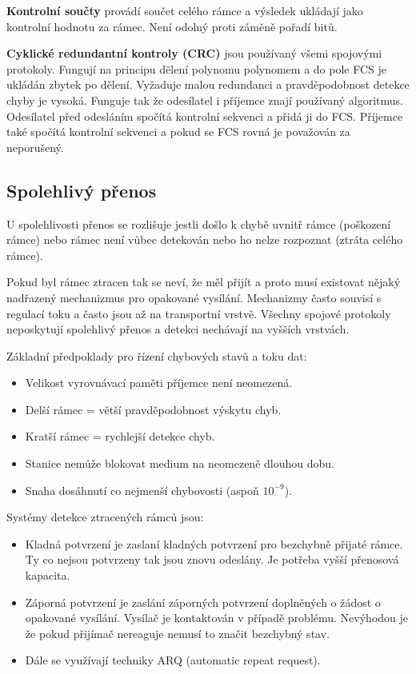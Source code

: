 \textbf{Kontrolní součty} provádí součet celého rámce a výsledek ukládají jako kontrolní hodnotu za rámec. Není odolný proti záměně pořadí bitů.

\textbf{Cyklické redundantní kontroly (CRC)} jsou používaný všemi spojovými protokoly. Fungují na principu dělení polynomu polynomem a do pole FCS je ukládán zbytek po dělení. Vyžaduje malou redundanci a pravděpodobnost detekce chyby je vysoká. Funguje tak že odesílatel i příjemce znají používaný algoritmus. Odesílatel před odesláním spočítá kontrolní sekvenci a přidá ji do FCS. Příjemce také spočítá kontrolní sekvenci a pokud se FCS rovná je považován za neporušený.

\subsection{Spolehlivý přenos}

U spolehlivosti přenos se rozlišuje jestli došlo k chybě uvnitř rámce (poškození rámce) nebo rámec není vůbec detekován nebo ho nelze rozpoznat (ztráta celého rámce).

Pokud byl rámec ztracen tak se neví, že měl přijít a proto musí existovat nějaký nadřazený mechanizmus pro opakované vysílání. Mechanizmy často souvisí s regulací toku a často jsou až na transportní vrstvě. Všechny spojové protokoly neposkytují spolehlivý přenos a detekci nechávají na vyšších vrstvách.

Základní předpoklady pro řízení chybových stavů a toku dat:
\begin{itemize}[noitemsep]
    \item Velikost vyrovnávací paměti příjemce není neomezená.
    \item Delší rámec = větší pravděpodobnost výskytu chyb.
    \item Kratší rámec = rychlejší detekce chyb.
    \item Stanice nemůže blokovat medium na neomezeně dlouhou dobu.
    \item Snaha dosáhnutí co nejmenší chybovosti (aspoň $10^{-9}$).
\end{itemize}

Systémy detekce ztracených rámců jsou:
\begin{itemize}[noitemsep]
    \item Kladná potvrzení je zaslaní kladných potvrzení pro bezchybně přijaté rámce. Ty co nejsou potvrzeny tak jsou znovu odeslány. Je potřeba vyšší přenosová kapacita.
    \item Záporná potvrzení je zaslání záporných potvrzení doplněných o žádost o opakované vysílání. Vysílač je kontaktován v případě problému. Nevýhodou je že pokud přijímač nereaguje nemusí to značit bezchybný stav.
    \item Dále se využívají techniky ARQ (automatic repeat request).
\end{itemize}

